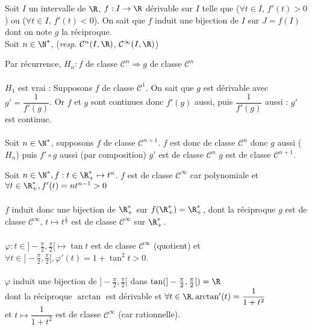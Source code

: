 \documentclass[12pt,a4paper]{report}
\begin{document}
\begin{theoreme}{}{}
Soit $I$ un intervalle de $\R$, $f:I\to \R$ dérivable sur $I$ telle que ($\forall t \in I$, $f'(t)>0$) ou ($\forall t \in I$, $f'(t)<0$). On sait que $f$ induit une bijection de $I$ sur $J=f(I)$ dont on note $g$ la réciproque. \\
Soit $n \in \N^*$, (\textit{resp.} $\mathcal{C}^n(I,\R)$, $\mathcal{C}^\infty(I,\R)$)
\end{theoreme}

\begin{demo}
Par récurrence, $H_n : f$ de classe $\mathcal{C}^n \Longrightarrow g$ de classe $\mathcal{C}^n$ \\ \\
$H_1$ est vrai : Supposons $f$ de classe $\mathcal{C}^1$. On sait que $g$ est dérivable avec $g' = \dfrac{1}{f'(g)}$. Or $f$ et $g$ sont continues donc $f'(g)$ aussi, puis $\dfrac{1}{f'(g)}$ aussi : $g'$ est continue. \\ \\
Soit $n \in \N^*$, supposons $f$ de classe $\mathcal{C}^{n+1}$. $f$ est donc de classe $\mathcal{C}^n$ donc $g$ aussi ($H_n$) puis $f' \circ g$ aussi (par composition) \ie $g'$ est de classe $\mathcal{C}^n$ \ie $g$ est de classe $\mathcal{C}^{n+1}$.
\end{demo}

\begin{exemple}
Soit $n \in \N^*, f : t \in \R_+^* \mapsto t^n$. $f$ est de classe $\mathcal{C}^{\infty}$ car polynomiale et $\forall t \in \R_+^*, f'(t)=nt^{n-1}>0$ \\ \\
$f$ induit donc une bijection de $\R_+^*$ sur $f(\R_+^*) = \R_+^*$, dont la réciproque $g$ est de classe $\mathcal{C}^{\infty}$, \ie $t \mapsto t^{\frac{1}{n}}$ est de classe $\mathcal{C}^{\infty}$ sur $\R_+^*$. \\ \\
$\varphi : t \in ]-\frac{\pi}{2},\frac{\pi}{2}[ \mapsto \tan t$ est de classe $\mathcal{C}^{\infty}$ (quotient) et $\forall t \in ]-\frac{\pi}{2},\frac{\pi}{2}[, \varphi'(t) = 1+\tan^2 t > 0$. \\ \\
$\varphi$ induit une bijection de $]-\frac{\pi}{2},\frac{\pi}{2}[$ dans $\tan(]-\frac{\pi}{2},\frac{\pi}{2}[) = \R$ \\
dont la réciproque $\arctan$ est dérivable et $\forall t \in \R, \arctan'(t) = \dfrac{1}{1+t^2}$ \\
et $t \mapsto \dfrac{1}{1+t^2}$ est de classe $\mathcal{C}^{\infty}$ (car rationnelle).
\end{exemple}
\end{document}
